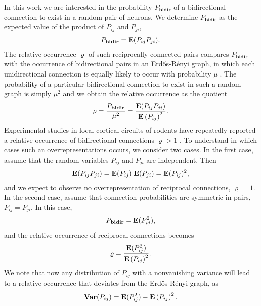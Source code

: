 In this work we are interested in the probability $P_{\mathbf{bidir}}$
of a bidirectional connection to exist in a random pair of neurons.
%
We determine $P_{\mathbf{bidir}}$ as the expected value of the product
of $P_{ij}$ and $P_{ji}$,
%
\begin{align}
P_{\mathbf{bidir}} = \operatorname{\mathbf{E}}(P_{ij} P_{ji}).
\end{align}
%
The relative occurrence $\varrho$ of such reciprocally connected pairs compares $P_{\mathbf{bidir}}$ with the occurrence of bidirectional pairs in an Erd\H{o}s-R\'{e}nyi graph, in which each unidirectional connection is equally likely to occur with probability $\mu$ \cite{Gilbert1959, Erdos1959}. The probability of a particular bidirectional connection to exist in such a random graph is simply $\mu^2$ and we obtain the relative occurrence as the quotient
\begin{align}
\varrho = \frac{P_{\mathbf{bidir}}}{\mu^2} = \frac{\operatorname{\mathbf{E}}(P_{ij}P_{ji})}{{\operatorname{\mathbf{E}}\left(P_{ij}\right)}^2}.\label{eq:rho}
\end{align}
%
Experimental studies in local cortical circuits of rodents have repeatedly reported a relative occurrence of bidirectional connections $\varrho > 1$ \cite{Markram1997, Song2005, Perin2011}. To understand in which cases such an overrepresentations occurs, we consider two cases. In the first case, assume that the random variables $P_{ij}$ and $P_{ji}$ are independent. Then
\begin{align}
\operatorname{\mathbf{E}}(P_{ij} P_{ji}) = \operatorname{\mathbf{E}}(P_{ij})\,\operatorname{\mathbf{E}}(P_{ji}) = \operatorname{\mathbf{E}}(P_{ij})^2,
\end{align}
and we expect to observe no overrepresentation of reciprocal connections, $\varrho = 1$.  In the second case, assume that connection probabilities are symmetric in pairs, $P_{ij} = P_{ji}$. In this case,
\begin{align}
P_{\mathbf{bidir}} = \operatorname{\mathbf{E}}(P_{ij}^2),
\end{align}
%
and the relative occurrence of reciprocal connections becomes
\begin{align}
\varrho = \frac{\operatorname{\mathbf{E}}(P_{ij}^2)}{{\operatorname{\mathbf{E}}\left(P_{ij}\right)}^2}.
\end{align}
We note that now any distribution of $P_{ij}$ with a nonvanishing
variance will lead to a relative occurrence that deviates from the
Erd\H{o}s-R\'{e}nyi graph, as
\begin{align}
\operatorname{\mathbf{Var}}(P_{ij}) = \operatorname{\mathbf{E}}(P_{ij}^2) - \operatorname{\mathbf{E}}\left(P_{ij}\right)^2.
\end{align}
